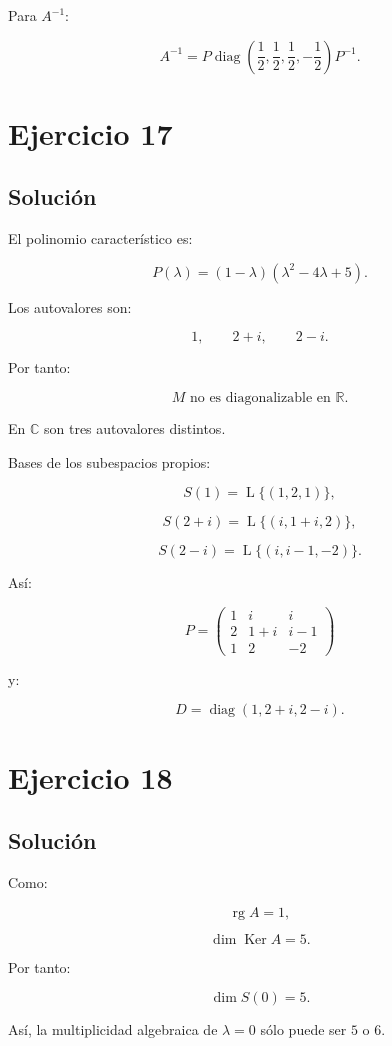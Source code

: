 \documentclass[11pt,a4paper]{article}
\newcommand{\R}{\mathbb{R}}
\newcommand{\C}{\mathbb{C}}
\newcommand{\Ker}{\operatorname{Ker}}
\newcommand{\rg}{\operatorname{rg}}
\newcommand{\diag}{\operatorname{diag}}
\newcommand{\Span}{\operatorname{L}}
\begin{document}
Para $A^{-1}$:

\[
\boxed{
A^{-1}
=
P
\diag
\left(
\frac12,\frac12,\frac12,-\frac12
\right)
P^{-1}.
}
\]

\section{Ejercicio 17}
\subsection{Solución}

El polinomio característico es:

\[
P(\lambda)
=
(1-\lambda)(\lambda^2-4\lambda+5).
\]

Los autovalores son:

\[
1,\qquad2+i,\qquad2-i.
\]

Por tanto:

\[
\boxed{
M\text{ no es diagonalizable en }\R.
}
\]

En $\C$ son tres autovalores distintos.

Bases de los subespacios propios:

\[
S(1)=\Span\{(1,2,1)\},
\]

\[
S(2+i)=\Span\{(i,1+i,2)\},
\]

\[
S(2-i)=\Span\{(i,i-1,-2)\}.
\]

Así:

\[
\boxed{
P=
\begin{pmatrix}
1&i&i\\
2&1+i&i-1\\
1&2&-2
\end{pmatrix}
}
\]

y:

\[
\boxed{
D=
\diag(1,2+i,2-i).
}
\]

\section{Ejercicio 18}
\subsection{Solución}

Como:

\[
\rg A=1,
\]

\[
\dim\Ker A=5.
\]

Por tanto:

\[
\dim S(0)=5.
\]

Así, la multiplicidad algebraica de $\lambda=0$ sólo puede ser $5$ o $6$.
\end{document}
